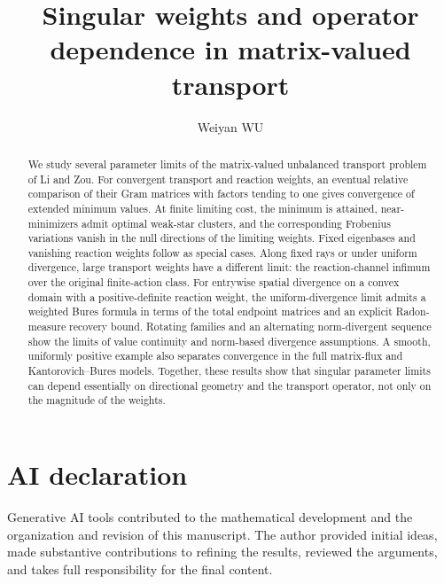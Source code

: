 \documentclass[11pt]{article}
\title{Singular weights and operator dependence in matrix-valued transport}
\author{Weiyan WU}
\date{}
\theoremstyle{definition}
\begin{document}
\maketitle
\begin{abstract}
We study several parameter limits of the matrix-valued unbalanced transport
problem of Li and Zou. For convergent transport and reaction weights, an
eventual relative comparison of their Gram matrices with factors tending to one gives convergence of
extended minimum values. At finite limiting cost, the minimum is attained,
near-minimizers admit optimal weak-star clusters, and the corresponding
Frobenius variations vanish in the null directions of the limiting weights.
Fixed eigenbases and vanishing reaction
weights follow as special cases. Along fixed rays or under uniform divergence,
large transport weights have a different limit: the reaction-channel infimum over the original finite-action class.
For entrywise spatial divergence on a convex domain with a positive-definite
reaction weight, the uniform-divergence limit admits a weighted Bures formula
in terms of the total endpoint matrices and an explicit Radon-measure recovery
bound. Rotating families and an alternating norm-divergent sequence show the
limits of value continuity and norm-based divergence assumptions. A smooth,
uniformly positive example also separates convergence in the full matrix-flux
and Kantorovich--Bures models. Together, these results show that singular parameter limits can depend
essentially on directional geometry and the transport operator, not only
on the magnitude of the weights.
\end{abstract}











\section*{AI declaration}
Generative AI tools contributed to the mathematical development and the organization and revision of this manuscript. The author provided initial ideas, made substantive contributions to refining the results, reviewed the arguments, and takes full responsibility for the final content.


\end{document}
